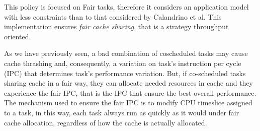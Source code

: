 \begin{description}
This policy is focused on Fair tasks, therefore it considers an application model with less constraints than to that considered by
Calandrino et al. This implementation ensures \textit{fair cache sharing}, that is a strategy throughput oriented.

As we have previously seen, a bad combination of coscheduled tasks may cause cache thrashing and, consequently, a variation on task's instruction per cycle
(IPC) that determines task's performance variation. But, if co-scheduled tasks sharing cache in a fair way, they can allocate needed resources in cache and
they experience the fair IPC, that is the IPC that ensure the best overall performance. The mechanism used to ensure the fair IPC is to modify CPU timeslice 
assigned to a task, in this way, each task always run as quickly as it would under fair cache allocation, regardless of how the cache is actually allocated.


\end{description}
